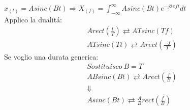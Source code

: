                {
                    $x_{(t)}=Asinc(Bt) \Rightarrow X_{(f)} = \int_{-\infty}^{\infty}A sinc(Bt)e^{-j2\pi ft}dt$ \\
                    Applico la dualitá:
                    \begin{gather}
                        A rect\left(\frac{t}{T}\right) \rightleftarrows ATsinc(Tf) \nonumber \\
                        ATsinc(Tt) \rightleftarrows A rect\left(\frac{-f}{T}\right) \nonumber
                    \end{gather}
                    Se voglio una durata generica:
                    \begin{gather}
                        Sostituisco\ B=T \nonumber \\
                        ABsinc(Bt) \rightleftarrows A rect\left(\frac{f}{B}\right) \nonumber  \\
                        \Downarrow \nonumber \\
                        Asinc(Bt) \rightleftarrows \frac{A}{B}rect\left(\frac{f}{B}\right) \nonumber
                    \end{gather}
                }

